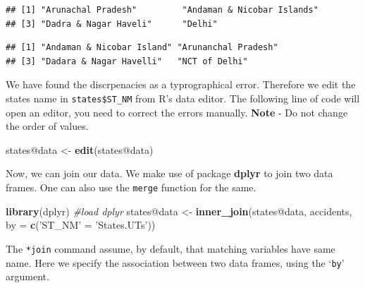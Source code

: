 \documentclass[]{article}
\newenvironment{Shaded}{}{}
\newcommand{\CommentTok}[1]{\textcolor[rgb]{0.38,0.63,0.69}{\textit{#1}}}
\newcommand{\DataTypeTok}[1]{\textcolor[rgb]{0.56,0.13,0.00}{#1}}
\newcommand{\KeywordTok}[1]{\textcolor[rgb]{0.00,0.44,0.13}{\textbf{#1}}}
\newcommand{\NormalTok}[1]{#1}
\newcommand{\OperatorTok}[1]{\textcolor[rgb]{0.40,0.40,0.40}{#1}}
\newcommand{\StringTok}[1]{\textcolor[rgb]{0.25,0.44,0.63}{#1}}
\begin{document}
\begin{verbatim}
## [1] "Arunachal Pradesh"         "Andaman & Nicobar Islands"
## [3] "Dadra & Nagar Haveli"      "Delhi"
\end{verbatim}

\begin{Shaded}
\end{Shaded}

\begin{verbatim}
## [1] "Andaman & Nicobar Island" "Arunanchal Pradesh"      
## [3] "Dadara & Nagar Havelli"   "NCT of Delhi"
\end{verbatim}

We have found the discrpenacies as a typrographical error. Therefore we
edit the states name in \texttt{states\$ST\_NM} from R's data editor.
The following line of code will open an editor, you need to correct the
errors manually. \textbf{Note} - Do not change the order of values.

\begin{Shaded}
\begin{Highlighting}[]
\NormalTok{states}\OperatorTok{@}\NormalTok{data <-}\StringTok{ }\KeywordTok{edit}\NormalTok{(states}\OperatorTok{@}\NormalTok{data)}
\end{Highlighting}
\end{Shaded}

Now, we can join our data. We make use of package \textbf{dplyr} to join
two data frames. One can also use the \texttt{merge} function for the
same.

\begin{Shaded}
\begin{Highlighting}[]
\KeywordTok{library}\NormalTok{(dplyr)  }\CommentTok{#load dplyr}
\NormalTok{states}\OperatorTok{@}\NormalTok{data <-}\StringTok{ }\KeywordTok{inner_join}\NormalTok{(states}\OperatorTok{@}\NormalTok{data, accidents, }\DataTypeTok{by =} \KeywordTok{c}\NormalTok{(}\StringTok{'ST_NM'}\NormalTok{ =}\StringTok{ 'States.UTs'}\NormalTok{))}
\end{Highlighting}
\end{Shaded}

The \texttt{*join} command assume, by default, that matching variables
have same name. Here we specify the association between two data frames,
using the `\texttt{by}' argument.
\end{document}
